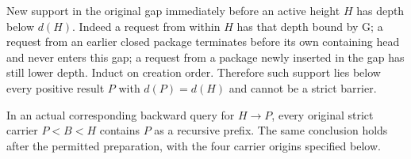 New support in the original gap immediately before an active height
$H$ has depth below $d(H)$. Indeed a request from within $H$ has that
depth bound by G; a request from an earlier closed package terminates
before its own containing head and never enters this gap; a request
from a package newly inserted in the gap has still lower depth. Induct
on creation order. Therefore such support lies below every positive
result $P$ with $d(P)=d(H)$ and cannot be a strict barrier.

\begin{proposition}\label{prop:strict-barrier}
In an actual corresponding backward query for $H\to P$, every original
strict carrier $P<B<H$ contains $P$ as a recursive prefix. The same
conclusion holds after the permitted preparation, with the four carrier
origins specified below.
\end{proposition}
